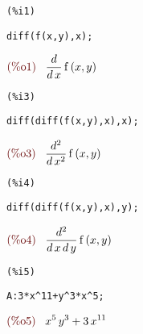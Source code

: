 \documentclass{article}
\begin{document}
\noindent
\begin{minipage}[t]{8ex}{\color{red}\bf
\begin{verbatim}
(%i1) 
\end{verbatim}}
\end{minipage}
\begin{minipage}[t]{\textwidth}{\color{blue}
\begin{verbatim}
diff(f(x,y),x);
\end{verbatim}}
\end{minipage}
\begin{math}\displaystyle
\parbox{8ex}{\color{labelcolor}(\%o1) }
\frac{d}{d\,x}\,\mathrm{f}\left( x,y\right) 
\end{math}


\noindent
\begin{minipage}[t]{8ex}{\color{red}\bf
\begin{verbatim}
(%i3) 
\end{verbatim}}
\end{minipage}
\begin{minipage}[t]{\textwidth}{\color{blue}
\begin{verbatim}
diff(diff(f(x,y),x),x);
\end{verbatim}}
\end{minipage}
\begin{math}\displaystyle
\parbox{8ex}{\color{labelcolor}(\%o3) }
\frac{{d}^{2}}{d\,{x}^{2}}\,\mathrm{f}\left( x,y\right) 
\end{math}


\noindent
\begin{minipage}[t]{8ex}{\color{red}\bf
\begin{verbatim}
(%i4) 
\end{verbatim}}
\end{minipage}
\begin{minipage}[t]{\textwidth}{\color{blue}
\begin{verbatim}
diff(diff(f(x,y),x),y);
\end{verbatim}}
\end{minipage}
\begin{math}\displaystyle
\parbox{8ex}{\color{labelcolor}(\%o4) }
\frac{{d}^{2}}{d\,x\,d\,y}\,\mathrm{f}\left( x,y\right) 
\end{math}


\noindent
\begin{minipage}[t]{8ex}{\color{red}\bf
\begin{verbatim}
(%i5) 
\end{verbatim}}
\end{minipage}
\begin{minipage}[t]{\textwidth}{\color{blue}
\begin{verbatim}
A:3*x^11+y^3*x^5;
\end{verbatim}}
\end{minipage}
\begin{math}\displaystyle
\parbox{8ex}{\color{labelcolor}(\%o5) }
{x}^{5}\,{y}^{3}+3\,{x}^{11}
\end{math}
\end{document}
